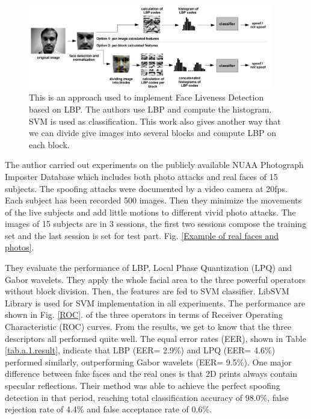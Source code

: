 \documentclass[journal]{IEEEtran}
\begin{document}
\begin{figure}[htbp]
\centering
\includegraphics[width=0.95\textwidth]{img/2-A-(1).png}
\caption{This is an approach \cite{chingovska2012effectiveness} used to implement Face Liveness Detection based on LBP. The authors use LBP and compute the histogram. SVM is used as classification. This work also gives another way that we can divide give images into several blocks and compute LBP on each block.}
\label{lbp_based_approach}
\end{figure}

\bigskip

The author carried out experiments on the publicly available NUAA Photograph Imposter Database\cite{tan2010face} which includes both photo attacks and real faces of 15 subjects. The spoofing attacks were documented by a video camera at 20fps. Each subject has been recorded 500 images. Then they minimize the movements of the live subjects and add little motions to different vivid photo attacks. The images of 15 subjects are  in 3 sessions, the first two sessions compose the training set and the last session is set for test part. Fig. \ref{Example of real faces and photos}. 

They evaluate the performance of LBP, Local Phase Quantization (LPQ) and Gabor wavelets. They apply the whole facial area to the three powerful operators without block division. Then, the features are fed to SVM classifier. LibSVM Library is used for SVM implementation in all experiments. The performance are shown in Fig. \ref{ROC}. of the three operators in terms of Receiver Operating Characteristic (ROC) curves. From the results, we get to know that the three descriptors all performed quite well. The equal error rates (EER), shown in Table \ref{tab.a.1.result}, indicate that LBP (EER= 2.9\%) and LPQ (EER= 4.6\%) performed similarly, outperforming Gabor wavelets (EER= 9.5\%). One major difference between fake faces and the real ones is that 2D prints always contain specular reflections. Their method was able to achieve the perfect spoofing detection in that period, reaching total classification accuracy of 98.0\%, false rejection rate of 4.4\% and false acceptance rate of 0.6\%\cite{maatta2011face}.
\end{document}
